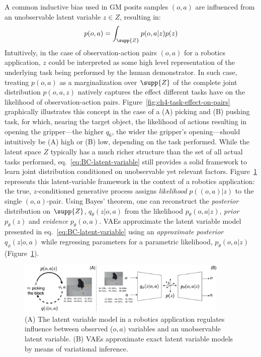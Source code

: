 A common inductive bias used in GM posits samples \( (o,a) \) are influenced from an unobservable latent variable \( z \in Z \), resulting in:
\begin{equation}\label{eq:BC-latent-variable}
    p (o,a) = \int_{\supp{Z}} p(o,a \vert z) p(z)
\end{equation}
Intuitively, in the case of observation-action pairs \( (o, a) \) for a robotics application, \( z \) could be interpreted as some high level representation of the underlying task being performed by the human demonstrator.
In such case, treating \( p(o,a) \) as a marginalization over \( \supp{Z} \) of the complete joint distribution \( p(o,a,z) \) natively captures the effect different tasks have on the likelihood of observation-action pairs.
Figure~\ref{fig:ch4-task-effect-on-pairs} graphically illustrates this concept in the case of a (A) picking and (B) pushing task, for which, nearing the target object, the likelihood of actions resulting in opening the gripper---the higher \( q_6 \), the wider the gripper's opening---should intuitively be (A) high or (B) low, depending on the task performed.
While the latent space \( Z \) typically has a much richer structure than the set of all actual tasks performed, eq.~\ref{eq:BC-latent-variable} still provides a solid framework to learn joint distribution conditioned on unobservable yet relevant factors.
Figure~\ref{fig:ch4-latent-variable-model} represents this latent-variable framework in the context of a robotics application: the true, \( z \)-conditioned generative process assigns \emph{likelihood} \( p((o,a) \vert z) \) to the single \( (o,a) \)-pair.
Using Bayes' theorem, one can reconstruct the \emph{posterior} distribution on \( \supp{Z} \), \( q_\theta(z \vert o,a) \) from the likelihood \( p_\theta(o,a \vert z) \), \emph{prior} \( p_\theta(z) \) and \emph{evidence} \( p_\theta(o,a) \).
VAEs approximate the latent variable model presented in eq.~\ref{eq:BC-latent-variable} using an \emph{approximate posterior} \(q_\phi(z \vert o,a) \) while regressing parameters for a parametric likelihood, \( p_\theta(o,a \vert z) \) (Figure~\ref{fig:ch4-latent-variable-model}).

\begin{figure}
    \centering
    \includegraphics[width=0.9\textwidth]{figures/ch4/ch4-latent-variable-model.png}
    \caption{(A) The latent variable model in a robotics application regulates influence between observed (\(o,a) \) variables and an unobservable latent variable. (B) VAEs approximate exact latent variable models by means of variational inference. }
    \label{fig:ch4-latent-variable-model}
\end{figure}

